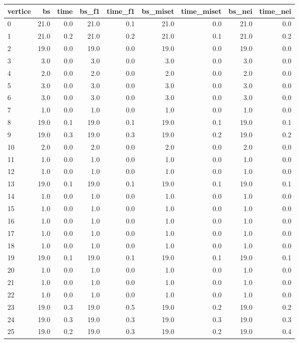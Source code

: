 \begin{tabular}{lrrrrrrrr}
\toprule
vertice & bs & time & bs_f1 & time_f1 & bs_miset & time_miset & bs_nei & time_nei \\
\midrule
0 & 21.0 & 0.0 & 21.0 & 0.1 & 21.0 & 0.0 & 21.0 & 0.0 \\
1 & 21.0 & 0.2 & 21.0 & 0.2 & 21.0 & 0.1 & 21.0 & 0.2 \\
2 & 19.0 & 0.0 & 19.0 & 0.0 & 19.0 & 0.0 & 19.0 & 0.0 \\
3 & 3.0 & 0.0 & 3.0 & 0.0 & 3.0 & 0.0 & 3.0 & 0.0 \\
4 & 2.0 & 0.0 & 2.0 & 0.0 & 2.0 & 0.0 & 2.0 & 0.0 \\
5 & 3.0 & 0.0 & 3.0 & 0.0 & 3.0 & 0.0 & 3.0 & 0.0 \\
6 & 3.0 & 0.0 & 3.0 & 0.0 & 3.0 & 0.0 & 3.0 & 0.0 \\
7 & 1.0 & 0.0 & 1.0 & 0.0 & 1.0 & 0.0 & 1.0 & 0.0 \\
8 & 19.0 & 0.1 & 19.0 & 0.1 & 19.0 & 0.1 & 19.0 & 0.1 \\
9 & 19.0 & 0.3 & 19.0 & 0.3 & 19.0 & 0.2 & 19.0 & 0.2 \\
10 & 2.0 & 0.0 & 2.0 & 0.0 & 2.0 & 0.0 & 2.0 & 0.0 \\
11 & 1.0 & 0.0 & 1.0 & 0.0 & 1.0 & 0.0 & 1.0 & 0.0 \\
12 & 1.0 & 0.0 & 1.0 & 0.0 & 1.0 & 0.0 & 1.0 & 0.0 \\
13 & 19.0 & 0.1 & 19.0 & 0.1 & 19.0 & 0.1 & 19.0 & 0.1 \\
14 & 1.0 & 0.0 & 1.0 & 0.0 & 1.0 & 0.0 & 1.0 & 0.0 \\
15 & 1.0 & 0.0 & 1.0 & 0.0 & 1.0 & 0.0 & 1.0 & 0.0 \\
16 & 1.0 & 0.0 & 1.0 & 0.0 & 1.0 & 0.0 & 1.0 & 0.0 \\
17 & 1.0 & 0.0 & 1.0 & 0.0 & 1.0 & 0.0 & 1.0 & 0.0 \\
18 & 1.0 & 0.0 & 1.0 & 0.0 & 1.0 & 0.0 & 1.0 & 0.0 \\
19 & 19.0 & 0.1 & 19.0 & 0.1 & 19.0 & 0.1 & 19.0 & 0.1 \\
20 & 1.0 & 0.0 & 1.0 & 0.0 & 1.0 & 0.0 & 1.0 & 0.0 \\
21 & 1.0 & 0.0 & 1.0 & 0.0 & 1.0 & 0.0 & 1.0 & 0.0 \\
22 & 1.0 & 0.0 & 1.0 & 0.0 & 1.0 & 0.0 & 1.0 & 0.0 \\
23 & 19.0 & 0.3 & 19.0 & 0.5 & 19.0 & 0.2 & 19.0 & 0.2 \\
24 & 19.0 & 0.3 & 19.0 & 0.3 & 19.0 & 0.3 & 19.0 & 0.3 \\
25 & 19.0 & 0.2 & 19.0 & 0.3 & 19.0 & 0.2 & 19.0 & 0.4 \\

\end{tabular}
